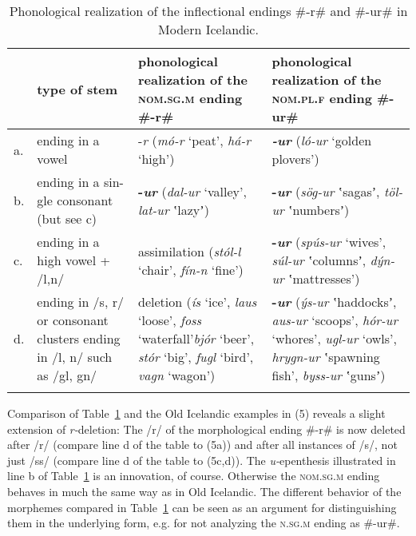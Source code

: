 \documentclass[output=paper,
modfonts
]{LSP/langsci}
\begin{document}
\begin{table}
\begin{tabularx}{\textwidth}{@{}l>{\raggedright}p{1in}>{\raggedright}X>{\raggedright}X@{}}
\lsptoprule
& type of stem & phonological realization of the \textsc{nom.sg.m} ending \#-r\# & phonological realization of the \textsc{nom.pl.f} ending \#-ur\#\tabularnewline
\midrule
a. & ending in a vowel & -\emph{r} \newline (\emph{mó-r} `peat', \emph{há-r}
`high') & \emph{\textbf{-ur}} \newline (\emph{ló-ur} `golden
plovers')\tabularnewline
b. & ending in a sin- gle consonant (but see c) & \textbf{-\emph{ur}} \newline (\emph{dal-ur} `valley', \emph{lat-ur} ʽlazyʼ) & \textbf{-\emph{ur}}
\newline (\emph{sög-ur} ʽsagasʼ, \emph{töl-ur} ʽnumbersʼ)\tabularnewline
c. & ending in a high vowel + /l,n/ & assimilation \newline (\emph{stól-l} `chair',
\emph{fín-n} `fine') & \textbf{-\emph{ur}} \newline (\emph{spús-ur} `wives',
\emph{súl-ur} ʽcolumnsʼ, \emph{dýn-ur} ʽmattresses')\tabularnewline
d. & ending in /s, r/ or consonant clusters ending in /l, n/ such as /gl,
gn/ & deletion \newline (\emph{ís} `ice', \emph{laus} `loose', \emph{foss}
`waterfall'\emph{bjór} `beer', \emph{stór} `big', \emph{fugl} `bird',
\emph{vagn} `wagon') & \textbf{-\emph{ur}} \newline (\emph{ýs-ur} ʽhaddocksʼ,
\emph{aus-ur} `scoops', \emph{hór-ur} `whores', \emph{ugl-ur} `owls',
\emph{hrygn-ur} ʽspawning fish', \emph{byss-ur} ʽgunsʼ)\tabularnewline
\lspbottomrule
\end{tabularx}
\caption{Phonological realization of the inflectional endings
	\#-r\# and \#-ur\# in Modern Icelandic.}
\label{tab:-r-ur}
\end{table}

Comparison of Table~\ref{tab:-r-ur} and the Old Icelandic examples in (5) reveals a
slight extension of \emph{r-}deletion: The /r/ of the morphological
ending \#-r\# is now deleted after /r/ (compare line d of the table to
(5a)) and after all instances of /s/, not just /ss/ (compare line d of
the table to (5c,d)). The \emph{u-}epenthesis illustrated in line b of
Table~\ref{tab:-r-ur} is an innovation, of course. Otherwise the \textsc{nom.sg.m}
ending behaves in much the same way as in Old Icelandic. The different
behavior of the morphemes compared in Table~\ref{tab:-r-ur} can be seen as an argument
for distinguishing them in the underlying form, e.g. for not analyzing
the \textsc{n.sg.m} ending as \#-ur\#.
\end{document}
